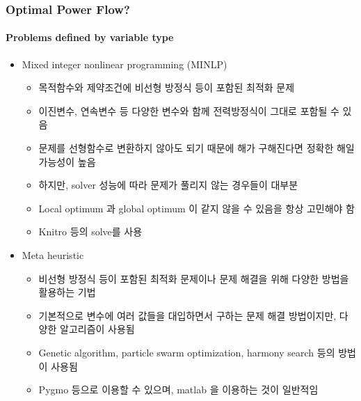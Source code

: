 \documentclass[
	11pt, %
	aspectratio=169, %
]{beamer}
\begin{document}
\begin{frame}
	\frametitle{Optimal Power Flow?}
	\framesubtitle{Problems defined by variable type} %
	
	\begin{itemize}
		\item Mixed integer nonlinear programming (MINLP)
		\begin{itemize}
			\item 목적함수와 제약조건에 비선형 방정식 등이 포함된 최적화 문제
			\item 이진변수, 연속변수 등 다양한 변수와 함께 전력방정식이 그대로 포함될 수 있음
			\item 문제를 선형함수로 변환하지 않아도 되기 때문에 해가 구해진다면 정확한 해일 가능성이 높음
			\item 하지만, solver 성능에 따라 문제가 풀리지 않는 경우들이 대부분
			\item Local optimum 과 global optimum 이 같지 않을 수 있음을 항상 고민해야 함
			\item Knitro 등의 solve를 사용

		\end{itemize}
		
		\item Meta heuristic
		\begin{itemize}
			\item 비선형 방정식 등이 포함된 최적화 문제이나 문제 해결을 위해 다양한 방법을 활용하는 기법
			\item 기본적으로 변수에 여러 값들을 대입하면서 구하는 문제 해결 방법이지만, 다양한 알고리즘이 사용됨
			\item Genetic algorithm, particle swarm optimization, harmony search 등의 방법이 사용됨
			\item Pygmo 등으로 이용할 수 있으며, matlab 을 이용하는 것이 일반적임

		\end{itemize}

	\end{itemize}
	
\end{frame}


\end{document}
